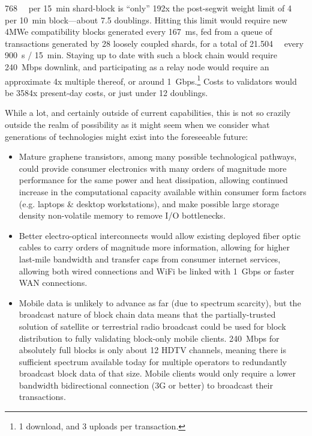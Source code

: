 \SI{768}{\mega\weight} per \SI{15}{\minute} shard-block is ``only''
\num{192}x the post-segwit weight limit of \SI{4}{\mega\weight} per
\SI{10}{\minute} block---about \num{7.5} doublings.  Hitting this
limit would require new 4MWe compatibility blocks generated every
\SI{167}{\milli\second}, fed from a queue of transactions generated by
\num{28} loosely coupled shards, for a total of
\SI{21.504}{\giga\weight} every \SI{900}{\second} / \SI{15}{\minute}.
Staying up to date with such a block chain would require
\SI{240}{Mbps} downlink, and participating as a relay node would
require an approximate \num{4}x multiple thereof, or around
\SI{1}{Gbps}.\footnote{\num{1} download, and \num{3} uploads per
  transaction.}  Costs to validators would be \num{3584}x present-day
costs, or just under \num{12} doublings.

While a lot, and certainly outside of current capabilities, this is
not so crazily outside the realm of possibility as it might seem when
we consider what generations of technologies might exist into the
foreseeable future:

\begin{itemize}

  \item

    Mature graphene transistors, among many possible technological
    pathways, could provide consumer electronics with many orders of
    magnitude more performance for the same power and heat
    dissipation, allowing continued increase in the computational
    capacity available within consumer form factors (e.g. laptops \&
    desktop workstations), and make possible large storage density
    non-volatile memory to remove I/O bottlenecks.

  \item

    Better electro-optical interconnects would allow existing deployed
    fiber optic cables to carry orders of magnitude more information,
    allowing for higher last-mile bandwidth and transfer caps from
    consumer internet services, allowing both wired connections and
    WiFi be linked with \SI{1}{Gbps} or faster WAN connections.

  \item

    Mobile data is unlikely to advance as far (due to spectrum
    scarcity), but the broadcast nature of block chain data means that
    the partially-trusted solution of satellite or terrestrial radio
    broadcast could be used for block distribution to fully validating
    block-only mobile clients.  \SI{240}{Mbps} for absolutely full
    blocks is only about \num{12} HDTV channels, meaning there is
    sufficient spectrum available today for multiple operators to
    redundantly broadcast block data of that size.  Mobile clients
    would only require a lower bandwidth bidirectional connection (3G
    or better) to broadcast their transactions.

\end{itemize}

